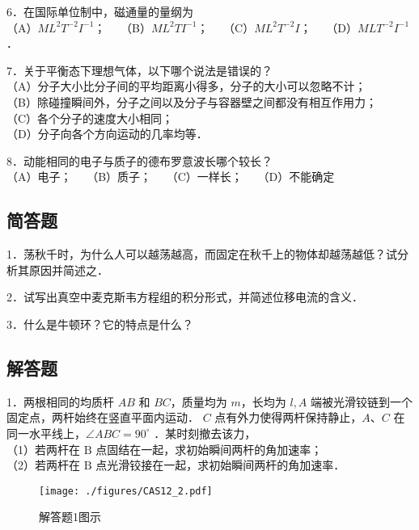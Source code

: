 6．在国际单位制中，磁通量的量纲为\\
（A）$M L^{2} T^{-2} I^{-1}$；$\quad$
（B）$M L^{2} T I^{-1}$；$\quad$
（C）$M L^{2} T^{-2} I$；$\quad$
（D）$M L T^{-2} I^{-1}$．

7．关于平衡态下理想气体，以下哪个说法是错误的？\\
（A）分子大小比分子间的平均距离小得多，分子的大小可以忽略不计；\\
（B）除碰撞瞬间外，分子之间以及分子与容器壁之间都没有相互作用力；\\
（C）各个分子的速度大小相同；\\
（D）分子向各个方向运动的几率均等．

8．动能相同的电子与质子的德布罗意波长哪个较长？\\
（A）电子；$\quad$
（B）质子；$\quad$
（C）一样长；$\quad$
（D）不能确定

\subsection{简答题}

1．荡秋千时，为什么人可以越荡越高，而固定在秋千上的物体却越荡越低？试分析其原因并简述之．

2．试写出真空中麦克斯韦方程组的积分形式，并简述位移电流的含义．

3．什么是牛顿环？它的特点是什么？
\subsection{解答题}
1．两根相同的均质杆 $A B$ 和 $B C$，质量均为 $m$，长均为 $l, A$ 端被光滑铰链到一个固定点，两杆始终在竖直平面内运动． $C$ 点有外力使得两杆保持静止，$A $、$ C$ 在同一水平线上，$\angle A B C=90^{\circ}$ ．某时刻撤去该力，\\
（1）若两杆在 $\mathrm{B}$ 点固结在一起，求初始瞬间两杆的角加速率；\\
（2）若两杆在 $\mathrm{B}$ 点光滑铰接在一起，求初始瞬间两杆的角加速率．
\begin{figure}[ht]
\centering
\texttt{[image: ./figures/CAS12\_2.pdf]}
\caption{解答题1图示} \label{CAS12_fig2}
\end{figure}

